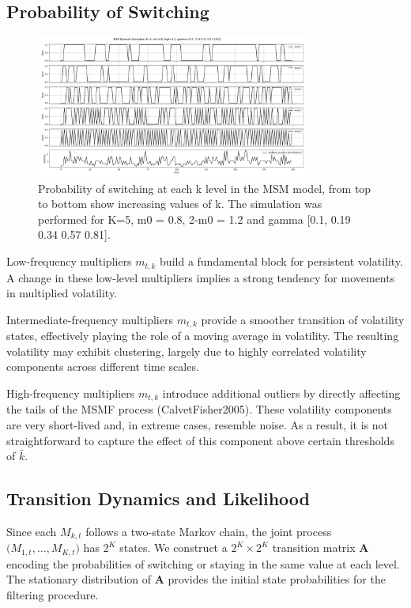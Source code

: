 \subsection{Probability of Switching}

\begin{figure}[!ht]
    \centering
    \includegraphics[width=0.8\textwidth]{img/k_analysis}
    \caption{Probability of switching at each k level in the MSM model, from top to bottom show increasing values of k.
    The simulation was performed for K=5, m0 = 0.8, 2-m0 = 1.2 and gamma [0.1, 0.19 0.34 0.57 0.81].}
    \label{fig:k_analysis}
\end{figure}

\FloatBarrier

Low-frequency multipliers $m_{t,k}$ build a fundamental block for persistent volatility.
A change in these low-level multipliers implies a strong tendency for movements in multiplied volatility.

Intermediate-frequency multipliers $m_{t,k}$ provide a smoother transition of volatility states,
effectively playing the role of a moving average in volatility. The resulting volatility may exhibit
clustering, largely due to highly correlated volatility components across different time scales.


High-frequency multipliers $m_{t,k}$ introduce additional outliers by directly affecting the
tails of the MSMF process (CalvetFisher2005). These volatility components are very short-lived and,
in extreme cases, resemble noise. As a result, it is not straightforward to capture the effect of this
component above certain thresholds of $\bar{k}$.

\subsection{Transition Dynamics and Likelihood}
Since each $M_{k,t}$ follows a two-state Markov chain, the joint process $\bigl(M_{1,t}, \dots, M_{K,t}\bigr)$ has $2^K$ states. We construct a $2^K \times 2^K$ transition matrix $\mathbf{A}$ encoding the probabilities of switching or staying in the same value at each level. The stationary distribution of $\mathbf{A}$ provides the initial state probabilities for the filtering procedure.

